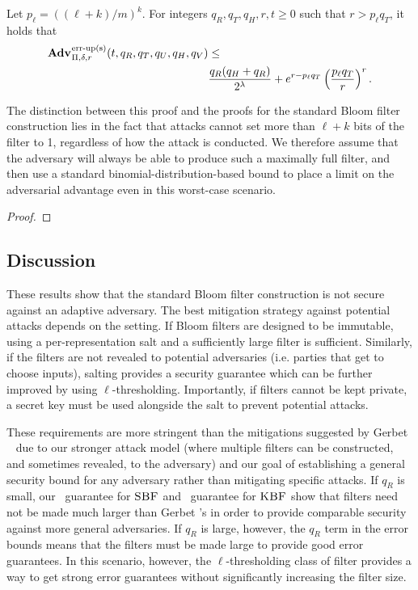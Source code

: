 %
\begin{theorem}\label{thm:bf-thr-bound}
Let $p_\ell = ((\ell+k)/m)^k$. For integers $q_R, q_T, q_H, r, t \geq 0$ such
that $r > p_\ell q_T$, it holds that
  \begin{equation*}
    \begin{aligned}
      \Adv{\erreps}_{\Pi,\delta,r}(t, q_R,q_T,q_U,q_H,q_V) &\leq \\
        & \frac{q_R(q_H+q_R)}{2^\lambda} + e^{r-p_\ell q_T}\left(\frac{p_\ell q_T}{r}\right)^r.
    \end{aligned}
  \end{equation*}
\end{theorem}

The distinction between this proof and the proofs for the standard Bloom filter
construction lies in the fact that attacks cannot set more than
$\ell+k$ bits of the filter to 1, regardless of how the attack is conducted.
We therefore assume that the adversary will always be able to produce such a
maximally full filter, and then use a standard binomial-distribution-based bound
to place a limit on the adversarial advantage even in this worst-case scenario.

\begin{proof}
  
\end{proof}


\subsection{Discussion}

These results show that the standard Bloom filter construction is not secure
against an adaptive adversary. The best mitigation strategy against potential
attacks depends on the setting. If Bloom filters are designed to be immutable,
using a per-representation salt and a sufficiently large filter is sufficient.
Similarly, if the filters are not revealed to potential adversaries (i.e.
parties that get to choose inputs), salting provides a security guarantee which
can be further improved by using $\ell$-thresholding. Importantly, if filters
cannot be kept private, a secret key must be used alongside the salt to prevent
potential attacks.

These requirements are more stringent than the mitigations suggested by Gerbet
\etal~\cite{gerbet2015power} due to our stronger attack model (where multiple
filters can be constructed, and sometimes revealed, to the adversary) and our
goal of establishing a general security bound for any adversary rather than
mitigating specific attacks. If $q_R$ is small, our \erreps\ guarantee for
$\textnormal{\textsc{SBF}}$ and \errep\ guarantee for $\textnormal{\textsc{KBF}}$ show that filters need not be made much
larger than Gerbet \etal's in order to provide comparable security against more
general adversaries. If $q_R$ is large, however, the $q_R$ term in the error
bounds means that the filters must be made large to provide good error
guarantees. In this scenario, however, the $\ell$-thresholding class of filter
provides a way to get strong error guarantees without significantly increasing
the filter size.


